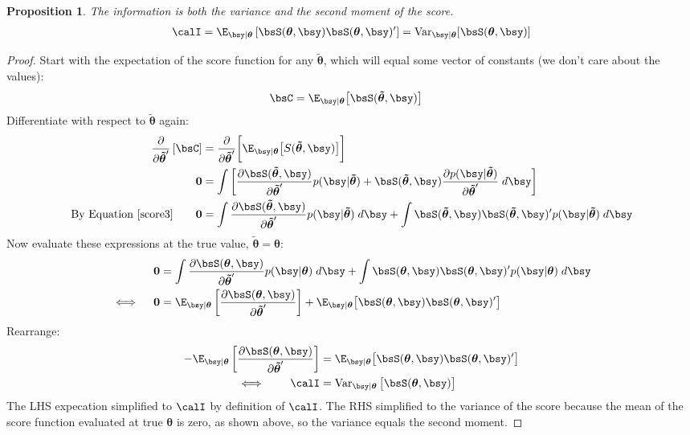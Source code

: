\documentclass[12pt]{article}
\theoremstyle{plain}
\newtheorem{prop}[thm]{Proposition}
\theoremstyle{definition}
\theoremstyle{remark}
\newcommand{\bstheta}{\boldsymbol{\theta}}
\newcommand{\bstildetheta}{\boldsymbol{\tilde{\theta}}}
\renewcommand{\bso}{\boldsymbol{0}}
\newcommand{\Var}{\operatorname{Var}}
\begin{document}
\begin{prop}
The information is both the variance and the second moment of the score.
\begin{align*}
  \calI
  = \E_{\bsy|\bstheta}\left[\bsS(\bstheta,\bsy)\bsS(\bstheta,\bsy)'\right]
  = \Var_{\bsy|\bstheta}[\bsS(\bstheta,\bsy)]
\end{align*}
\end{prop}
\begin{proof}
Start with the expectation of the score function for any
$\bstildetheta$, which will equal some vector of constants (we don't
care about the values):
\begin{align*}
  \bsC
  &= \E_{\bsy|\bstheta}\big[\bsS(\bstildetheta,\bsy)\big]
\end{align*}
Differentiate with respect to $\bstildetheta$ again:
\begin{align*}
  \frac{\partial}{\partial\bstildetheta'}
  \left[ \bsC \right]
  &=
  \frac{\partial}{\partial\bstildetheta'}
  \bigg[
  \E_{\bsy|\bstheta}\big[S(\bstildetheta,\bsy)\big]
  \bigg] \\
  \bso &=
  \int
  \left[
  \frac{\partial \bsS(\bstildetheta,\bsy)}{\partial\bstildetheta'}
  p(\bsy|\bstildetheta)
  +
  \bsS(\bstildetheta,\bsy)
  \frac{\partial p(\bsy|\bstildetheta)}{\partial\bstildetheta'}
  \;
  d\bsy
  \right]
  \\
  \text{By Equation~\ref{score3}}
  \qquad
  \bso &=
  \int
  \frac{\partial \bsS(\bstildetheta,\bsy)}{\partial\bstildetheta'}
  p(\bsy|\bstildetheta)
  \; d\bsy
  +
  \int
  \bsS(\bstildetheta,\bsy)\bsS(\bstildetheta,\bsy)' p(\bsy|\bstildetheta) \;
  d\bsy
\end{align*}
Now evaluate these expressions at the true value,
$\bstildetheta=\bstheta$:
\begin{align*}
  \bso &=
  \int
  \frac{\partial \bsS(\bstheta,\bsy)}{\partial\bstildetheta'}
  p(\bsy|\bstheta)
  \; d\bsy
  +
  \int
  \bsS(\bstheta,\bsy)\bsS(\bstheta,\bsy)' p(\bsy|\bstheta) \;
  d\bsy
  \\
  \iff\quad
  \bso
  &=
  \E_{\bsy|\bstheta}\left[
  \frac{\partial \bsS(\bstheta,\bsy)}{\partial\bstildetheta'}
  \right]
  +
  \E_{\bsy|\bstheta}\big[
  \bsS(\bstheta,\bsy)\bsS(\bstheta,\bsy)'
  \big]
\end{align*}
Rearrange:
\begin{align*}
  -\E_{\bsy|\bstheta}\left[
  \frac{\partial \bsS(\bstheta,\bsy)}{\partial\bstildetheta'}
  \right]
  &=
  \E_{\bsy|\bstheta}\big[
  \bsS(\bstheta,\bsy)\bsS(\bstheta,\bsy)'
  \big] \\
  \iff \qquad
  \calI
  &=
  \Var_{\bsy|\bstheta}\big[
  \bsS(\bstheta,\bsy)
  \big]
\end{align*}
The LHS expecation simplified to $\calI$ by definition of $\calI$. The
RHS simplified to the variance of the score because the mean of the
score function evaluated at true $\bstheta$ is zero, as shown above, so
the variance equals the second moment.
\end{proof}
\end{document}
